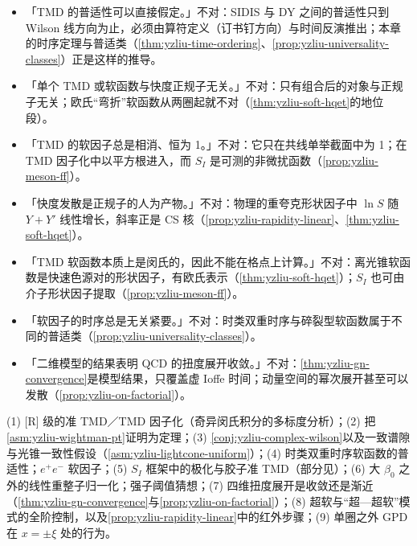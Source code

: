 \begin{tcolorbox}[enhanced,breakable,colback=gray!3!white,colframe=gray!45!black,boxrule=0.5pt,arc=2pt,left=4pt,right=4pt,top=2pt,bottom=2pt,title={常见误解},fonttitle=\bfseries\small]
\small
\begin{itemize}[leftmargin=1.2em,itemsep=1pt,topsep=1pt]
\item 「TMD 的普适性可以直接假定。」不对：SIDIS 与 DY 之间的普适性只到 Wilson 线方向为止，必须由算符定义（订书钉方向）与时间反演推出；本章的时序定理与普适类（\cref{thm:yzliu-time-ordering}、\cref{prop:yzliu-universality-classes}）正是这样的推导。
\item 「单个 TMD 或软函数与快度正规子无关。」不对：只有组合后的对象与正规子无关；欧氏“弯折”软函数从两圈起就不对（\cref{thm:yzliu-soft-hqet}的地位段）。
\item 「TMD 的软因子总是相消、恒为 1。」不对：它只在共线单举截面中为 1；在 TMD 因子化中以平方根进入，而 $S_I$ 是可测的非微扰函数（\cref{prop:yzliu-meson-ff}）。
\item 「快度发散是正规子的人为产物。」不对：物理的重夸克形状因子中 $\ln S$ 随 $Y+Y'$ 线性增长，斜率正是 CS 核（\cref{prop:yzliu-rapidity-linear}、\cref{thm:yzliu-soft-hqet}）。
\item 「TMD 软函数本质上是闵氏的，因此不能在格点上计算。」不对：离光锥软函数是快速色源对的形状因子，有欧氏表示（\cref{thm:yzliu-soft-hqet}）；$S_I$ 也可由介子形状因子提取（\cref{prop:yzliu-meson-ff}）。
\item 「软因子的时序总是无关紧要。」不对：时类双重时序与碎裂型软函数属于不同的普适类（\cref{prop:yzliu-universality-classes}）。
\item 「二维模型的结果表明 QCD 的扭度展开收敛。」不对：\cref{thm:yzliu-gn-convergence}是模型结果，只覆盖虚 Ioffe 时间；动量空间的幂次展开甚至可以发散（\cref{prop:yzliu-on-factorial}）。
\end{itemize}
\end{tcolorbox}

\begin{remark}[开放问题]\label{rem:yzliu-open}
(1) [R] 级的准 TMD／TMD 因子化（奇异闵氏积分的多标度分析）；(2) 把\cref{asm:yzliu-wightman-pt}证明为定理；(3) \cref{conj:yzliu-complex-wilson}以及一致谱隙与光锥一致性假设（\cref{asm:yzliu-lightcone-uniform}）；(4) 时类双重时序软函数的普适性；$e^+e^-$ 软因子；(5) $S_I$ 框架中的极化与胶子准 TMD（部分见\cite{Ebert:2022fmh}）；(6) 大 $\beta_0$ 之外的线性重整子归一化；强子阈值猜想；(7) 四维扭度展开是收敛还是渐近（\cref{thm:yzliu-gn-convergence}与\cref{prop:yzliu-on-factorial}）；(8) 超软与“超—超软”模式的全阶控制，以及\cref{prop:yzliu-rapidity-linear}中的红外步骤；(9) 单圈之外 GPD 在 $x=\pm\xi$ 处的行为。
\end{remark}

